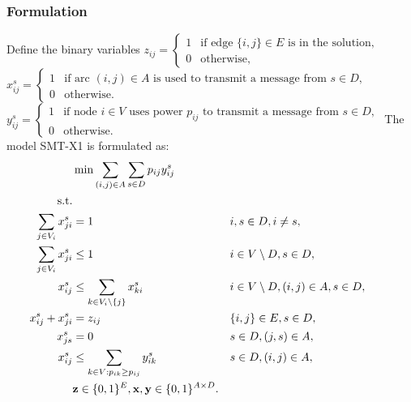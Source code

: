 \subsubsection{Formulation}
Define the binary variables
\newline\newline
  $z_{ij}=
	\begin{cases}
    1 & \text{if edge $\{i,j\} \in E$ is in the solution},\\
    0 & \text{otherwise},
  \end{cases}$
\newline\newline
  $x^{s}_{ij}=
	\begin{cases}
    1 & \text{if arc $(i,j) \in A$ is used to transmit a message from $s\in D$},\\
    0 & \text{otherwise}.
  \end{cases}$
  \newline\newline
  $y^s_{ij}=
	\begin{cases}
    1 & \text{if node $i \in V$ uses power $p_{ij}$ to transmit a message from $s\in D$},\\
    0 & \text{otherwise}.
  \end{cases}$
\newline
\newline    
The model SMT-X1 is formulated as:
\begin{subequations}\label{eq:smt-x1}
\begin{flalign}
\label{objective:dd} &\makebox[0pt][l]{$\displaystyle{}\min \sum\limits_{(i,j) \in A} \sum\limits_{s \in D} p_{ij} y^s_{ij} $}  & &&\\ \notag  
\text{s.t.}&  &  &                 && \\	\
\label{con:dd:arrowFromDest} \sum\limits_{j\in V_i}x^s_{ji} & = 1 && i,s\in D,i\neq s, && \\ 
\label{con:dd:arrowFromNonDestB} \sum\limits_{j\in V_{i}}x^s_{ji} & \leq 1 && i\in V \setminus D, s\in D,   &&\\	
\label{con:dd:arrowFromNonDestA} x^s_{ij}  & \leq \sum\limits_{k\in V_{i}\setminus \{j\}}x^s_{ki} && i\in V \setminus D,(i,j)\in A, s\in D,   &&\\	
\label{con:dd:oneDir} x^s_{ij} + x^s_{ji} & = z_{ij} && \{i,j\}\in E, s\in D, &&\\
\label{con:dd:startInSource}  x^s_{js}    & = 0   &&  s\in D, (j,s)\in A, &&\\		 
\label{con:dd:yvar} x^s_{ij} & \leq \sum\limits_{k\in V:p_{ik}\geq p_{ij}}y^s_{ik} && s\in D, (i,j)\in A, &&\\  
& \label{con:dd:vardim}	\mathbf{z} \in \{0,1\}^{E}, \mathbf{x},\mathbf{y}\in \{0,1\}^{A\times D}. &&	
\end{flalign}~
\end{subequations}  

